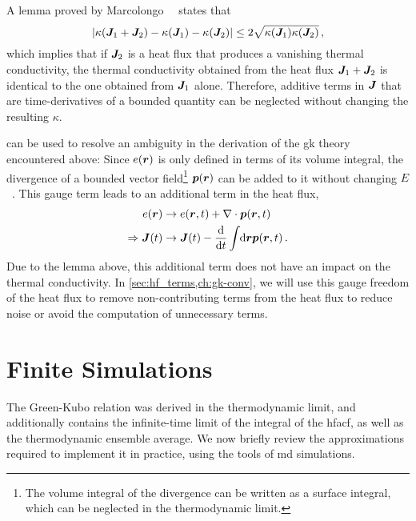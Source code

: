 A lemma proved by Marcolongo~\etal{}~\cite{mub2016t} states that
\begin{equation}
    |\kappa(\J_1 + \J_2) - \kappa(\J_1) - \kappa(\J_2)| \leq 2 \sqrt{\kappa(\J_1)\kappa(\J_2)} \, , \label{eq:gk_addition_lemma}
\end{equation}
which implies that if $\boldsymbol{J}_2$ is a heat flux that produces a vanishing thermal conductivity, the thermal conductivity obtained from the heat flux $\boldsymbol{J}_1 + \boldsymbol{J}_2$ is identical to the one obtained from $\boldsymbol{J}_1$ alone. Therefore, additive terms in $\boldsymbol{J}$ that are time-derivatives of a bounded quantity can be neglected without changing the resulting $\kappa$.

 can be used to resolve an ambiguity in the derivation of the \gls{gk} theory encountered above: Since $e(\boldsymbol{r})$ is only defined in terms of its volume integral, the divergence of a bounded vector field\footnote{The volume integral of the divergence can be written as a surface integral, which can be neglected in the thermodynamic limit.} $\boldsymbol{p}(\boldsymbol{r})$ can be added to it without changing $E$~\cite{cm1992t}. This gauge term leads to an additional term in the heat flux,
\begin{align}
    e(\boldsymbol{r}) &\rightarrow e(\boldsymbol{r}, t) + \nabla \cdot \boldsymbol{p}(\boldsymbol{r}, t) \\
    \Rightarrow \boldsymbol{J}(t) &\rightarrow \boldsymbol{J}(t) - \frac{\text{d}}{\text{d} t} \int_{} \, \text{d} \boldsymbol{r} \boldsymbol{p}(\boldsymbol{r}, t) \, .
\end{align}
Due to the lemma above, this additional term does not have an impact on the thermal conductivity. In \cref{sec:hf_terms,ch:gk-conv}, we will use this gauge freedom of the heat flux to remove non-contributing terms from the heat flux to reduce noise or avoid the computation of unnecessary terms.

\section{Finite Simulations}

The Green-Kubo relation was derived in the thermodynamic limit, and additionally contains the infinite-time limit of the integral of the \gls{hfacf}, as well as the thermodynamic ensemble average. We now briefly review the approximations required to implement it in practice, using the tools of \gls{md} simulations.

